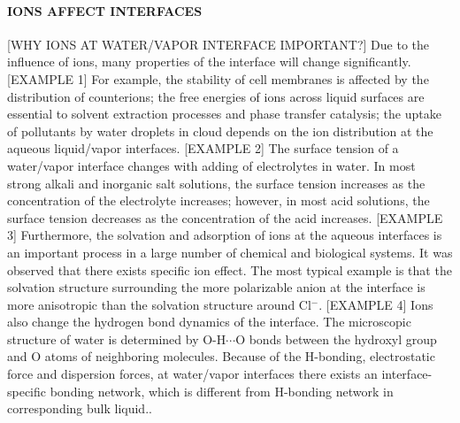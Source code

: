 \paragraph{IONS AFFECT INTERFACES}
[WHY IONS AT WATER/VAPOR INTERFACE IMPORTANT?]
Due to the influence of ions, many properties of the interface will change significantly.
[EXAMPLE 1]
For example, the stability of cell membranes is affected by the distribution of counterions\cite{Veziriglu1990}; 
the free energies of ions across liquid surfaces are essential to solvent extraction processes and phase transfer catalysis\cite{Starks1994};
the uptake of pollutants by water droplets in cloud depends on the ion distribution at the aqueous liquid/vapor interfaces.
%
[EXAMPLE 2]
The surface tension of a water/vapor interface changes with adding of electrolytes in water\cite{Pegram2006}.
In most strong alkali and inorganic salt solutions, the surface tension increases as the concentration of the electrolyte increases; 
however, in most acid solutions, the surface tension decreases as the concentration of the acid increases.
%
[EXAMPLE 3]
Furthermore, the solvation and adsorption of ions at the aqueous interfaces is an important process in a large number of chemical and biological systems\cite{Chang06}.
It was observed that there exists specific ion effect. 
The most typical example is that the solvation structure surrounding the more polarizable \I anion at the interface is more anisotropic than the solvation structure around Cl$^-$.
%
[EXAMPLE 4]
Ions also change the hydrogen bond dynamics of the interface.
The microscopic structure of water is determined by O-H$\cdots$O bonds between the hydroxyl group 
and O atoms of neighboring molecules. 
Because of the H-bonding, electrostatic force and dispersion forces, 
at water/vapor interfaces there exists an interface-specific bonding network, 
which is different from H-bonding network in corresponding bulk liquid.\cite{Allongue96,Velasco-Velez14}.
